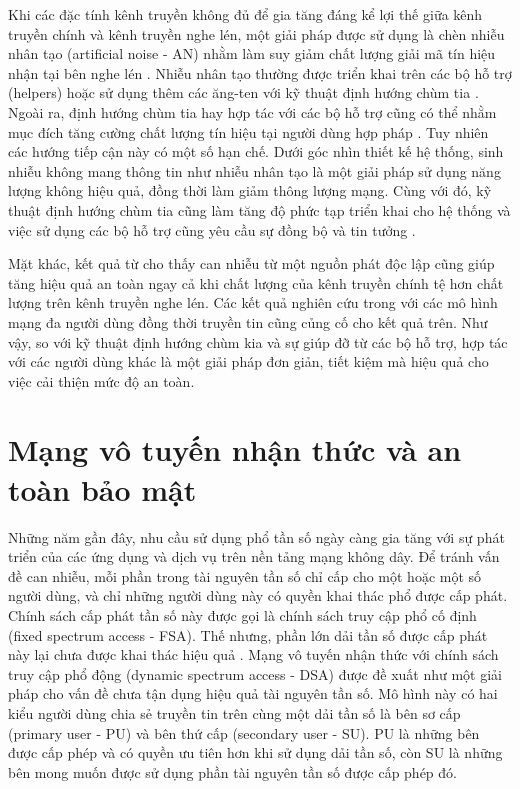 \documentclass[../main.tex]{subfiles}
\begin{document}
Khi các đặc tính kênh truyền không đủ để gia tăng đáng kể lợi thế giữa kênh truyền chính và kênh truyền nghe lén, một giải pháp được sử dụng là chèn nhiễu nhân tạo (artificial noise - AN) nhằm làm suy giảm chất lượng giải mã tín hiệu nhận tại bên nghe lén \cite{goel2008guaranteeing}. Nhiễu nhân tạo thường được triển khai trên các bộ hỗ trợ (helpers) hoặc sử dụng thêm các ăng-ten với kỹ thuật định hướng chùm tia \cite{zhou2011,cumanan2017secure,dong2009improving}. Ngoài ra, định hướng chùm tia hay hợp tác với các bộ hỗ trợ cũng có thể nhằm mục đích tăng cường chất lượng tín hiệu tại người dùng hợp pháp \cite{quach2017secrecy,dong2009improving}. Tuy nhiên các hướng tiếp cận này có một số hạn chế. Dưới góc nhìn thiết kế hệ thống, sinh nhiễu không mang thông tin như nhiễu nhân tạo là một giải pháp sử dụng năng lượng không hiệu quả, đồng thời làm giảm thông lượng mạng. Cùng với đó, kỹ thuật định hướng chùm tia cũng làm tăng độ phức tạp triển khai cho hệ thống \cite{sibomana2014impact} và việc sử dụng các bộ hỗ trợ cũng yêu cầu sự đồng bộ và tin tưởng \cite{yadav2021comprehensive}.

Mặt khác, kết quả từ \cite{tang2011interference} cho thấy can nhiễu từ một nguồn phát độc lập cũng giúp tăng hiệu quả an toàn ngay cả khi chất lượng của kênh truyền chính tệ hơn chất lượng trên kênh truyền nghe lén. Các kết quả nghiên cứu trong \cite{kalantari2015joint,xie2015secure,li2016} với các mô hình mạng đa người dùng đồng thời truyền tin cũng củng cố cho kết quả trên. Như vậy, so với kỹ thuật định hướng chùm kia và sự giúp đỡ từ các bộ hỗ trợ, hợp tác với các người dùng khác là một giải pháp đơn giản, tiết kiệm mà hiệu quả cho việc cải thiện mức độ an toàn.

\section{Mạng vô tuyến nhận thức và an toàn bảo mật}

Những năm gần đây, nhu cầu sử dụng phổ tần số ngày càng gia tăng với sự phát triển của các ứng dụng và dịch vụ trên nền tảng mạng không dây. Để tránh vấn đề can nhiễu, mỗi phần trong tài nguyên tần số chỉ cấp cho một hoặc một số người dùng, và chỉ những người dùng này có quyền khai thác phổ được cấp phát. Chính sách cấp phát tần số này được gọi là chính sách truy cập phổ cố định (fixed spectrum access - FSA). Thế nhưng, phần lớn dải tần số được cấp phát này lại chưa được khai thác hiệu quả \cite{liang2011}. Mạng vô tuyến nhận thức với chính sách truy cập phổ động (dynamic spectrum access - DSA) được đề xuất như một giải pháp cho vấn đề chưa tận dụng hiệu quả tài nguyên tần số. Mô hình này có hai kiểu người dùng chia sẻ truyền tin trên cùng một dải tần số là bên sơ cấp (primary user - PU) và bên thứ cấp (secondary user - SU). PU là những bên được cấp phép và có quyền ưu tiên hơn khi sử dụng dải tần số, còn SU là những bên mong muốn được sử dụng phần tài nguyên tần số được cấp phép đó.
\end{document}
